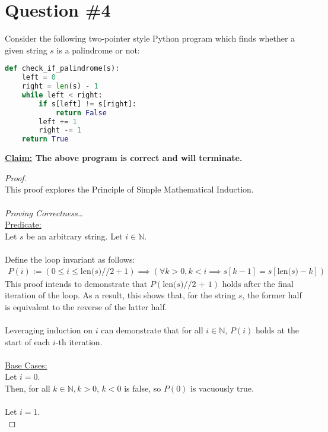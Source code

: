 \documentclass[12pt]{article}
\begin{document}
\section*{Question \#4}
Consider the following two-pointer style Python program which finds whether a given string $s$ is a palindrome or not:
\begin{lstlisting}[language=Python]
def check_if_palindrome(s):
    left = 0
    right = len(s) - 1
    while left < right:
        if s[left] != s[right]:
            return False
        left += 1
        right -= 1
    return True
\end{lstlisting}
\textbf{\underline{Claim:} The above program is correct and will terminate.}
\begin{proof}
\leavevmode\\
    This proof explores the Principle of Simple Mathematical Induction. \\
    \\
    \textit{Proving Correctness\dots} \\
    \underline{Predicate:} \\
    Let $s$ be an arbitrary string. Let $i \in \mathbb{N}$. \\
    \\
    Define the loop invariant as follows:
    \begin{equation*}
        \begin{aligned}
            P(i):= (0 \leq i \leq \text{len($s$)} // 2 + 1) \implies (\forall k > 0, k < i \implies s[k - 1] = s[\text{len($s$)} - k])
        \end{aligned}
    \end{equation*}
    This proof intends to demonstrate that $P(\text{len($s$)//2 + 1})$ holds after the final iteration of the loop. As a result, this shows that, for the string $s$, the former half is equivalent to the reverse of the latter half. \\
    \\
    Leveraging induction on $i$ can demonstrate that for all $i \in \mathbb{N}$, $P(i)$ holds at the start of each $i$-th iteration. \\
    \\
    \underline{Base Cases:} \\
    Let $i = 0$. \\
    Then, for all $k \in \mathbb{N}, k > 0$, $k < 0$ is false, so $P(0)$ is vacuously true. \\
    \\
    Let $i = 1$. \\

\end{proof}
\end{document}
